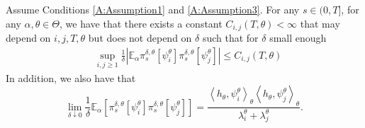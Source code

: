 \documentclass{article}
\begin{document}
\begin{lemma}\label{L:UsedForTightnessPsi}
Assume Conditions \ref{A:Assumption1} and \ref{A:Assumption3}. For any $s\in(0,T]$, for any $\alpha,\theta\in\Theta$, we have that there exists a constant $C_{i,j}(T,\theta)<\infty$ that may depend on $i,j,T,\theta$ but does not depend on $\delta$ such that for $\delta$ small enough
\begin{align*}
&\sup_{i,j\geq 1}\frac{1}{\delta}\left|\mathbb{E}_{\alpha}\pi_s^{\delta,\theta}[\psi_{i}^{\theta}]\pi_s^{\delta,\theta}[\psi_{j}^{\theta}]\right|
\leq C_{i,j}(T,\theta)
\end{align*}
In addition, we also have that
\[
\lim_{\delta\downarrow 0}\frac{1}{\delta}\mathbb{E}_{\alpha}\left[\pi^{\delta,\theta}_{s}[\psi_{i}^{\theta}]\pi^{\delta,\theta}_{s}[\psi_{j}^{\theta}]\right]=\frac{\left<h_{\theta},\psi_i^{\theta}\right>_{\theta} \left<h_{\theta},\psi_j^{\theta}\right>_{\theta}}{\lambda_i^{\theta}+\lambda_j^{\theta}}.
\]
\end{lemma}
\end{document}
